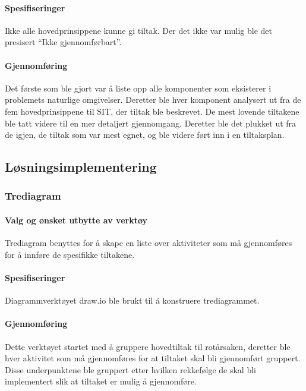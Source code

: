\paragraph{Spesifiseringer}
Ikke alle hovedprinsippene kunne gi tiltak. Der det ikke var mulig ble det presisert ``Ikke gjennomførbart''. 

\paragraph{Gjennomføring}
Det første som ble gjort var å liste opp alle komponenter som eksisterer i problemets naturlige omgivelser. Deretter ble hver komponent analysert ut fra de fem hovedprinsippene til SIT, der tiltak ble beskrevet. De mest lovende tiltakene ble tatt videre til en mer detaljert gjennomgang. Deretter ble det plukket ut fra de igjen, de tiltak som var mest egnet, og ble videre ført inn i en tiltaksplan. 


\subsection{Løsningsimplementering}

\subsubsection{Trediagram}

\paragraph{Valg og ønsket utbytte av verktøy}
Trediagram benyttes for å skape en liste over aktiviteter som må gjennomføres for å innføre de spesifikke tiltakene. 

\paragraph{Spesifiseringer}
Diagrammverktøyet draw.io ble brukt til å konstruere trediagrammet. 

\paragraph{Gjennomføring}
Dette verktøyet startet med å gruppere hovedtiltak til rotårsaken, deretter ble hver aktivitet som må gjennomføres for at tiltaket skal bli gjennomført gruppert. Disse underpunktene ble gruppert etter hvilken rekkefølge de skal bli implementert slik at tiltaket er mulig å gjennomføre. 


